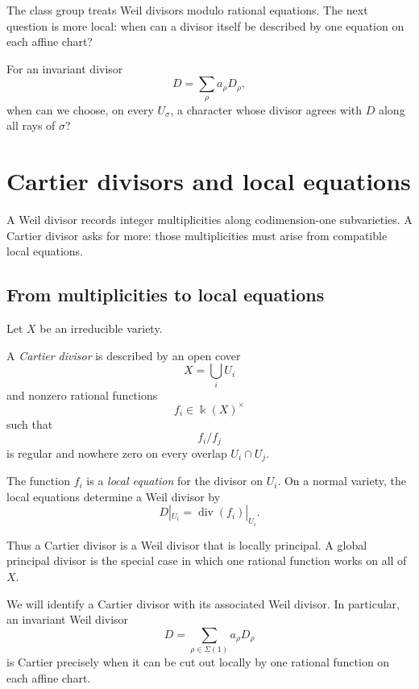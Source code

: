 The class group treats Weil divisors modulo rational equations. The
next question is more local: when can a divisor itself be described
by one equation on each affine chart?

\begin{guidingquestion}
For an invariant divisor
\[
D=\sum_\rho a_\rho D_\rho,
\]
when can we choose, on every \(U_\sigma\), a character whose divisor
agrees with \(D\) along all rays of \(\sigma\)?
\end{guidingquestion}


\section{Cartier divisors and local equations}
\label{sec:cartier-divisors-local-equations}

A Weil divisor records integer multiplicities along codimension-one
subvarieties. A Cartier divisor asks for more: those multiplicities
must arise from compatible local equations.

\subsection{From multiplicities to local equations}

\begin{agcheatsheet}
Let \(X\) be an irreducible variety.

A \emph{Cartier divisor} is described by an open cover
\[
X=\bigcup_i U_i
\]
and nonzero rational functions
\[
f_i\in\Bbbk(X)^\times
\]
such that
\[
f_i/f_j
\]
is regular and nowhere zero on every overlap \(U_i\cap U_j\).

The function \(f_i\) is a \emph{local equation} for the divisor on
\(U_i\). On a normal variety, the local equations determine a Weil
divisor by
\[
D|_{U_i}=\operatorname{div}(f_i)|_{U_i}.
\]

Thus a Cartier divisor is a Weil divisor that is locally principal.
A global principal divisor is the special case in which one rational
function works on all of \(X\).
\end{agcheatsheet}

We will identify a Cartier divisor with its associated Weil divisor.
In particular, an invariant Weil divisor
\[
D=\sum_{\rho\in\Sigma(1)}a_\rho D_\rho
\]
is Cartier precisely when it can be cut out locally by one rational
function on each affine chart.

